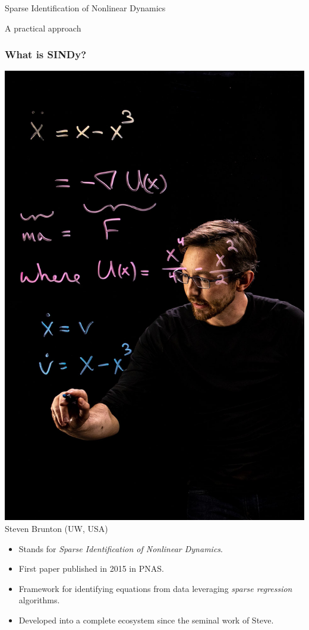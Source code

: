 \documentclass[aspectratio=169,compress,12pt,dvipsnames]{beamer}
\begin{document}
\begin{frame}
    Sparse Identification of Nonlinear Dynamics

    A practical approach
\end{frame}

\begin{frame}
    \frametitle{What is SINDy?}
    \begin{minipage}{.28\textwidth}
        \centering
        \includegraphics[width=\textwidth]{imgs/steve.jpg}
        \tiny
        Steven Brunton (UW, USA)
    \end{minipage}%
    \hfill
    \begin{minipage}{.68\textwidth}
        \vspace{-2em}
        \begin{itemize}
            \item Stands for \emph{Sparse Identification of Nonlinear Dynamics}.
            \item First paper published in 2015 in PNAS.
            \item Framework for identifying equations from data leveraging \emph{sparse regression} algorithms.
            \item Developed into a complete ecosystem since the seminal work of Steve.
        \end{itemize}
    \end{minipage}
    \vfill
\end{frame}
\end{document}
